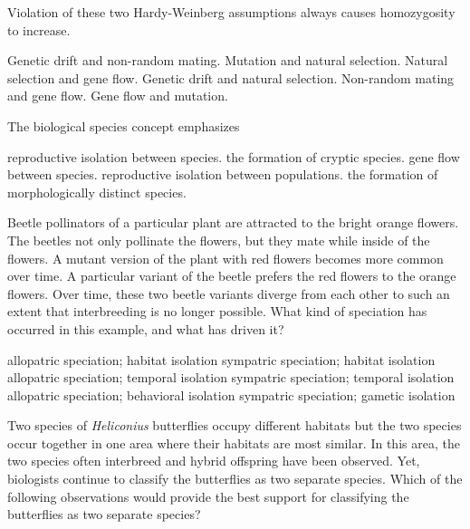 \question
Violation of these two Hardy-Weinberg assumptions always causes homozygosity to increase.

\begin{choices}
\correctchoice Genetic drift and non-random mating.%
\choice Mutation and natural selection.%
\choice Natural selection and gene flow.%
\choice Genetic drift and natural selection.%
\choice Non-random mating and gene flow.%
\choice Gene flow and mutation.%
\end{choices}


\question
The biological species concept emphasizes

\begin{choices}
\correctchoice reproductive isolation between species.%
\choice the formation of cryptic species.%
\choice gene flow between species.%
\choice reproductive isolation between populations.%
\choice the formation of morphologically distinct species.%
\end{choices}

\question
Beetle pollinators of a particular plant are attracted to the bright orange flowers. The beetles not only pollinate the flowers, but they mate while inside of the flowers. A mutant version of the plant with red flowers becomes more common over time. A particular variant of the beetle prefers the red flowers to the orange flowers. Over time, these two beetle variants diverge from each other to such an extent that interbreeding is no longer possible. What kind of speciation has occurred in this example, and what has driven it?

\begin{choices}
\choice allopatric speciation; habitat isolation%
\correctchoice sympatric speciation; habitat isolation%
\choice allopatric speciation; temporal isolation%
\choice sympatric speciation; temporal isolation%
\choice allopatric speciation; behavioral isolation%
\choice sympatric speciation; gametic isolation%
\end{choices}

\question
Two species of \textit{Heliconius} butterflies occupy different habitats but the two species occur together in one area where their habitats are most similar. In this area, the two species often interbreed and hybrid offspring have been observed.  Yet, biologists continue to classify the butterflies as two separate species.  Which of the following observations would provide the best support for classifying the butterflies as two separate species? 

